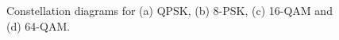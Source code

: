 \begin{figure}[tpb]
\begin{minipage}[h]{0.43\linewidth}
{    }
    \end{minipage}
    \vfill
    \begin{minipage}[h]{0.43\linewidth}
    \end{minipage}
    \hfill
    \begin{minipage}[h]{0.43\linewidth}
    \end{minipage}
    \caption{Constellation diagrams for (a) QPSK, (b) 8-PSK, (c) 16-QAM and (d) 64-QAM.}
    \label{fig:constil}
\end{figure}

